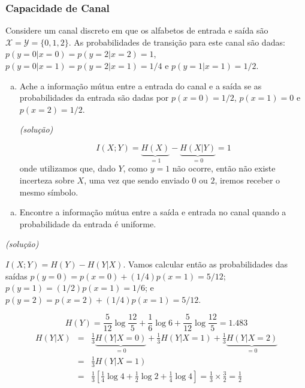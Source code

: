 \begin{frame}[allowframebreaks]
  \frametitle{Capacidade de Canal}

  \begin{exercise}
  Considere um canal discreto em que os alfabetos de entrada e saída são 
  $\mathcal{X} = \mathcal{Y} = \{0,1,2\}$. As probabilidades de transição 
  para este canal são dadas: $p(y=0 | x=0) = p(y=2 | x=2) = 1$, 
  $p(y=0 | x=1) = p(y=2 | x=1) = 1/4$ e $p(y=1 | x=1)=1/2$.

  \exercisebreak

  \begin{enumerate}[a)]
  \item Ache a informação mútua entre a entrada do canal e a saída se as probabilidades
  da entrada são dadas por $p(x=0)=1/2$, $p(x=1)=0$ e $p(x=2)=1/2$.

  \textit{(solução)}

  \begin{equation}
  I(X;Y) = \underbrace{H(X)}_{=1} - \underbrace{H(X|Y)}_{= 0} = 1
  \end{equation}
  onde utilizamos que, dado $Y$, como $y=1$ não ocorre, então não existe incerteza
  sobre $X$, uma vez que sendo enviado $0$ ou $2$, iremos receber o mesmo símbolo.
  \end{enumerate}

  \exercisebreak

  \begin{enumerate}[b)]
  \item Encontre a informação mútua entre a saída e entrada no canal quando a probabilidade
  da entrada é uniforme.
  \end{enumerate}

  \textit{(solução)}

  $I(X;Y) = H(Y) - H(Y|X)$. 
  Vamos calcular então as probabilidades das saídas
  $p(y=0) = p(x=0) + (1/4) p(x=1) = 5/12$; 
  $p(y=1) = (1/2) p(x=1) = 1/6$; e
  $p(y=2) = p(x=2) + (1/4)p(x=1) = 5/12$.
  \exercisebreak

  \begin{equation}
  H(Y) = \frac{5}{12} \log \frac{12}{5} + \frac{1}{6} \log 6 + \frac{5}{12} \log \frac{12}{5} = 1.483
  \end{equation}
  \vspace{-1em}
  \begin{eqnarray}
  H(Y|X) &=& \frac{1}{3} \underbrace{H(Y | X=0)}_{=0} + \frac{1}{3} H(Y | X=1) + \frac{1}{3} \underbrace{H(Y | X=2)}_{=0} \nonumber \\
         &=& \frac{1}{3} H(Y | X=1) \nonumber \\
	&=& \frac{1}{3} \left[ \frac{1}{4} \log 4 + \frac{1}{2} \log 2 + \frac{1}{4} \log 4 \right] = \frac{1}{3} \times \frac{3}{2} = \frac{1}{2}
  \end{eqnarray}
  \exercisebreak
 

\end{exercise}
\end{frame}

